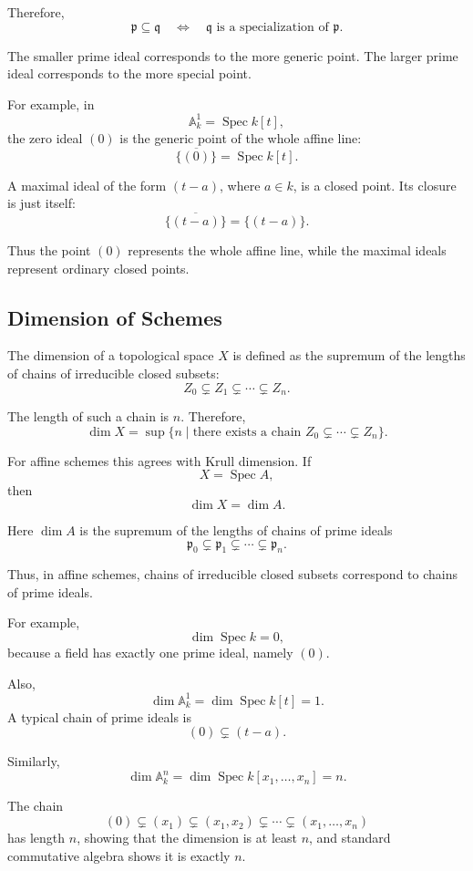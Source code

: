 \documentclass[12pt,a4paper]{article}
\DeclareMathOperator{\Spec}{Spec}
\providecommand{\Spec}{\operatorname{Spec}}
\theoremstyle{notespace}
\begin{document}
Therefore,
\[
\boxed{
	\mathfrak p\subseteq \mathfrak q
	\quad\Longleftrightarrow\quad
	\mathfrak q \text{ is a specialization of } \mathfrak p.
}
\]

The smaller prime ideal corresponds to the more generic point. The larger prime ideal corresponds to the more special point.

For example, in
\[
\mathbb A^1_k=\Spec k[t],
\]
the zero ideal \((0)\) is the generic point of the whole affine line:
\[
\overline{\{(0)\}}=\Spec k[t].
\]

A maximal ideal of the form \((t-a)\), where \(a\in k\), is a closed point. Its closure is just itself:
\[
\overline{\{(t-a)\}}=\{(t-a)\}.
\]

Thus the point \((0)\) represents the whole affine line, while the maximal ideals represent ordinary closed points.

\subsection{Dimension of Schemes}

The dimension of a topological space \(X\) is defined as the supremum of the lengths of chains of irreducible closed subsets:
\[
Z_0\subsetneq Z_1\subsetneq \cdots \subsetneq Z_n.
\]

The length of such a chain is \(n\). Therefore,
\[
\dim X
=
\sup\{n\mid \text{there exists a chain } Z_0\subsetneq \cdots \subsetneq Z_n\}.
\]

For affine schemes this agrees with Krull dimension. If
\[
X=\Spec A,
\]
then
\[
\dim X=\dim A.
\]

Here \(\dim A\) is the supremum of the lengths of chains of prime ideals
\[
\mathfrak p_0\subsetneq \mathfrak p_1\subsetneq \cdots \subsetneq \mathfrak p_n.
\]

Thus, in affine schemes, chains of irreducible closed subsets correspond to chains of prime ideals.

For example,
\[
\dim \Spec k=0,
\]
because a field has exactly one prime ideal, namely \((0)\).

Also,
\[
\dim \mathbb A^1_k
=
\dim \Spec k[t]
=
1.
\]
A typical chain of prime ideals is
\[
(0)\subsetneq (t-a).
\]

Similarly,
\[
\dim \mathbb A^n_k
=
\dim \Spec k[x_1,\dots,x_n]
=
n.
\]

The chain
\[
(0)
\subsetneq
(x_1)
\subsetneq
(x_1,x_2)
\subsetneq
\cdots
\subsetneq
(x_1,\dots,x_n)
\]
has length \(n\), showing that the dimension is at least \(n\), and standard commutative algebra shows it is exactly \(n\).
\end{document}
